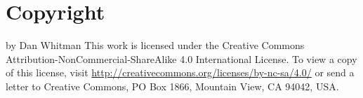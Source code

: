 \section*{Copyright}

\textcopyright{} \the\year{} by Dan Whitman
\newline
\newline
\def\liclink{http://creativecommons.org/licenses/by-nc-sa/4.0/}
This work is licensed under the Creative Commons Attribution-NonCommercial-ShareAlike 4.0 International License.
To view a copy of this license, visit \href{\liclink}{\liclink} or send a letter to Creative Commons, PO Box 1866, Mountain View, CA 94042, USA.

\begin{center}
  \ccbyncsa
\end{center}
